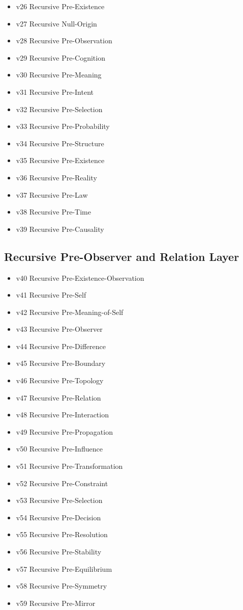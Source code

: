 \documentclass[11pt]{article}
\begin{document}
\begin{itemize}
\item v26 Recursive Pre-Existence
\item v27 Recursive Null-Origin
\item v28 Recursive Pre-Observation
\item v29 Recursive Pre-Cognition
\item v30 Recursive Pre-Meaning
\item v31 Recursive Pre-Intent
\item v32 Recursive Pre-Selection
\item v33 Recursive Pre-Probability
\item v34 Recursive Pre-Structure
\item v35 Recursive Pre-Existence
\item v36 Recursive Pre-Reality
\item v37 Recursive Pre-Law
\item v38 Recursive Pre-Time
\item v39 Recursive Pre-Causality
\end{itemize}

\subsection{Recursive Pre-Observer and Relation Layer}

\begin{itemize}
\item v40 Recursive Pre-Existence-Observation
\item v41 Recursive Pre-Self
\item v42 Recursive Pre-Meaning-of-Self
\item v43 Recursive Pre-Observer
\item v44 Recursive Pre-Difference
\item v45 Recursive Pre-Boundary
\item v46 Recursive Pre-Topology
\item v47 Recursive Pre-Relation
\item v48 Recursive Pre-Interaction
\item v49 Recursive Pre-Propagation
\item v50 Recursive Pre-Influence
\item v51 Recursive Pre-Transformation
\item v52 Recursive Pre-Constraint
\item v53 Recursive Pre-Selection
\item v54 Recursive Pre-Decision
\item v55 Recursive Pre-Resolution
\item v56 Recursive Pre-Stability
\item v57 Recursive Pre-Equilibrium
\item v58 Recursive Pre-Symmetry
\item v59 Recursive Pre-Mirror
\end{itemize}
\end{document}
